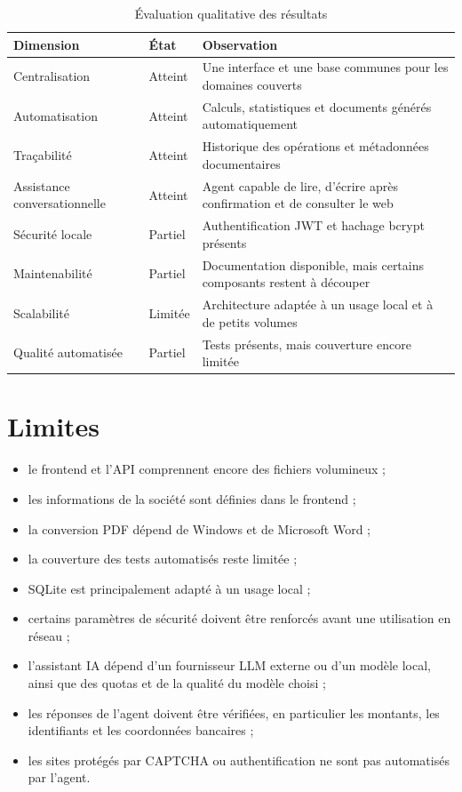\documentclass[12pt,a4paper,oneside]{report}
\begin{document}
\begin{table}[H]
\centering
\caption{Évaluation qualitative des résultats}
\begin{tabularx}{\textwidth}{Y p{3cm}Y}
\toprule
\textbf{Dimension} & \textbf{État} & \textbf{Observation}\\
\midrule
Centralisation
& Atteint
& Une interface et une base communes pour les domaines couverts\\

Automatisation
& Atteint
& Calculs, statistiques et documents générés automatiquement\\

Traçabilité
& Atteint
& Historique des opérations et métadonnées documentaires\\

Assistance conversationnelle
& Atteint
& Agent capable de lire, d'écrire après confirmation et de consulter le web\\

Sécurité locale
& Partiel
& Authentification JWT et hachage bcrypt présents\\

Maintenabilité
& Partiel
& Documentation disponible, mais certains composants restent à découper\\

Scalabilité
& Limitée
& Architecture adaptée à un usage local et à de petits volumes\\

Qualité automatisée
& Partiel
& Tests présents, mais couverture encore limitée\\
\bottomrule
\end{tabularx}
\end{table}

\section{Limites}

\begin{itemize}
  \item le frontend et l'API comprennent encore des fichiers volumineux ;
  \item les informations de la société sont définies dans le frontend ;
  \item la conversion PDF dépend de Windows et de Microsoft Word ;
  \item la couverture des tests automatisés reste limitée ;
  \item SQLite est principalement adapté à un usage local ;
  \item certains paramètres de sécurité doivent être renforcés avant
        une utilisation en réseau ;
  \item l'assistant IA dépend d'un fournisseur LLM externe ou d'un modèle
        local, ainsi que des quotas et de la qualité du modèle choisi ;
  \item les réponses de l'agent doivent être vérifiées, en particulier les
        montants, les identifiants et les coordonnées bancaires ;
  \item les sites protégés par CAPTCHA ou authentification ne sont pas
        automatisés par l'agent.
\end{itemize}
\end{document}

